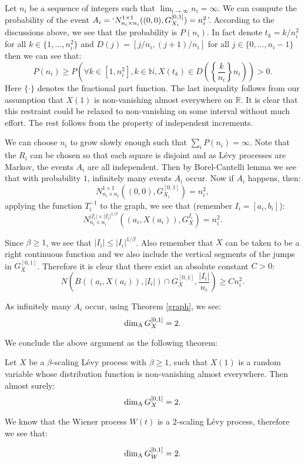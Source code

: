 Let $n_i$ be a sequence of integers such that $\lim_{i\to\infty} n_i=\infty$. We can compute the probability of the event $A_i=`N_{n_i\times n_i}^{1 \times 1 }((0,0),G_{X_i}^{[0,1]})=n_i^2 $'. According to the discussions above, we see that the probability is $P(n_i)$. In fact denote $t_k=k/n^2_i$ for all $k\in\{1,\dots,n^2_i\}$ and $D(j)=[j/n_i,(j+1)/n_i]$ for all $j\in\{0,\dots, n_i-1\}$ then we can see that:
\[
P(n_i)\geq P\left(\forall k\in\left[1,n^2_i\right], k\in \mathbb{N},X(t_k)\in D\left(\left\{\frac{k}{n_i}\right\}n_i\right)\right)>0.
\]
Here $\{ \cdot \}$ denotes the fractional part function. The last inequality follows from our assumption that $X(1)$ is non-vanishing almost everywhere on $\mathbb{R}$. It is clear that this restraint could be relaxed to non-vanishing on some interval without much effort. The rest follows from the property of independent increments.

We can choose $n_i$ to grow slowly enough such that $\sum_{i}P(n_i)=\infty$. Note that the $R_i$ can be chosen so that each square is disjoint and as L\'evy processes are Markov, the events $A_i$ are all independent. Then by Borel-Cantelli lemma we see that with probability $1$, infinitely many events $A_i$ occur. Now if $A_i$ happens, then:
\[
N_{n_i\times n_i}^{1 \times 1 }\left((0,0),G_{X_i}^{[0,1]}\right)=n_i^2,
\]
applying the function $T^{-1}_i$ to the graph, we see that (remember $I_i=[a_i,b_i]$):
\[
N_{n_i\times n_i}^{|I_i| \times |I_i|^{1/\beta} }\left((a_i,X(a_i)),G_{X}^{I_i}\right)=n_i^2.
\]

Since $\beta\geq 1$, we see that $|I_i|\leq |I_i|^{1/\beta}$. Also remember that $X$ can be taken to be a right continuous function and we also include the vertical segments of the jumps in $G^{[0,1]}_X$. Therefore it is clear that there exist an absolute constant $C>0$:
\[
N\left(B\left(\left(a_i,X(a_i)\right),|I_i|\right)\cap G_X^{[0,1]},\frac{|I_i|}{n_i}\right)\geq C n_i^2.
\] 

As infinitely many $A_i$ occur, using Theorem \ref{graph}, we see:
\[
\dim_{\textup{A}} G_{X}^{[0,1]}=2.
\]

We conclude the above argument as the following theorem:
\begin{thm}\label{Main}
	Let $X$ be a $\beta$-scaling L\'evy process with $\beta\geq 1$, such that $X(1)$ is a random variable whose distribution function is non-vanishing almost everywhere. Then almost surely:
	\[
	\dim_{\textup{A}} G_{X}^{[0,1]}=2.
	\]
\end{thm}

We know that the Wiener process $W(t)$ is a $2$-scaling L\'evy process, therefore we see that:
\begin{cor}
	\[
	\dim_{\textup{A}} G_{W}^{[0,1]}=2.
	\]
\end{cor}


